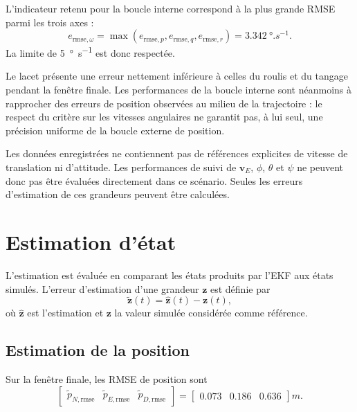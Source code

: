 \documentclass[11pt,a4paper,oneside]{report}
\newcommand{\vect}[1]{\bm{#1}}
\begin{document}
L'indicateur retenu pour la boucle interne correspond à la plus grande RMSE parmi les trois axes :
\begin{equation}
	e_{\mathrm{rmse},\omega}
	=
	\max\left(
	e_{\mathrm{rmse},p},
	e_{\mathrm{rmse},q},
	e_{\mathrm{rmse},r}
	\right)
	=
	\SI{3.342}{\degree.s^{-1}}.
	\label{eq_results_body_rate_max_rmse}
\end{equation}
La limite de \SI{5}{\degree.s^{-1}} est donc respectée.

Le lacet présente une erreur nettement inférieure à celles du roulis et du tangage pendant la fenêtre finale. Les performances de la boucle interne sont néanmoins à rapprocher des erreurs de position observées au milieu de la trajectoire : le respect du critère sur les vitesses angulaires ne garantit pas, à lui seul, une précision uniforme de la boucle externe de position.

Les données enregistrées ne contiennent pas de références explicites de vitesse de translation ni d'attitude. Les performances de suivi de $\vect v_E$, $\phi$, $\theta$ et $\psi$ ne peuvent donc pas être évaluées directement dans ce scénario. Seules les erreurs d'estimation de ces grandeurs peuvent être calculées.

\section{Estimation d'état}

L'estimation est évaluée en comparant les états produits par l'EKF aux états simulés. L'erreur d'estimation d'une grandeur $\vect z$ est définie par
\begin{equation}
	\tilde{\vect z}(t)
	=
	\hat{\vect z}(t)-\vect z(t),
	\label{eq_results_estimation_error}
\end{equation}
où $\hat{\vect z}$ est l'estimation et $\vect z$ la valeur simulée considérée comme référence.

\subsection{Estimation de la position}

Sur la fenêtre finale, les RMSE de position sont
\begin{equation}
	\begin{bmatrix}
		\tilde p_{N,\mathrm{rmse}} &
		\tilde p_{E,\mathrm{rmse}} &
		\tilde p_{D,\mathrm{rmse}}
	\end{bmatrix}
	=
	\begin{bmatrix}
		0.073 &
		0.186 &
		0.636
	\end{bmatrix}
	\si{m}.
	\label{eq_results_ekf_position_rmse}
\end{equation}
\end{document}
